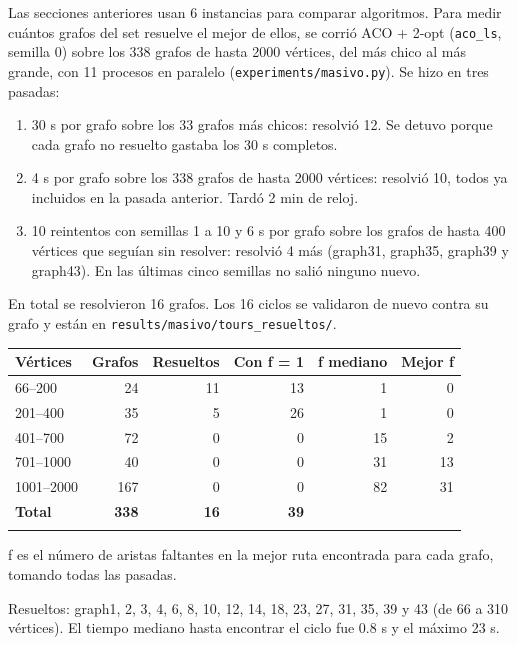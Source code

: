 \documentclass[
  spanish,
  11pt,
]{article}
\begin{document}
Las secciones anteriores usan 6 instancias para comparar algoritmos.
Para medir cuántos grafos del set resuelve el mejor de ellos, se corrió
ACO + 2-opt (\texttt{aco\_ls}, semilla 0) sobre los 338 grafos de hasta
2000 vértices, del más chico al más grande, con 11 procesos en paralelo
(\texttt{experiments/masivo.py}). Se hizo en tres pasadas:

\begin{enumerate}
\item
  30 s por grafo sobre los 33 grafos más chicos: resolvió 12. Se detuvo
  porque cada grafo no resuelto gastaba los 30 s completos.
\item
  4 s por grafo sobre los 338 grafos de hasta 2000 vértices: resolvió
  10, todos ya incluidos en la pasada anterior. Tardó 2 min de reloj.
\item
  10 reintentos con semillas 1 a 10 y 6 s por grafo sobre los grafos de
  hasta 400 vértices que seguían sin resolver: resolvió 4 más (graph31,
  graph35, graph39 y graph43). En las últimas cinco semillas no salió
  ninguno nuevo.
\end{enumerate}

En total se resolvieron 16 grafos. Los 16 ciclos se validaron de nuevo
contra su grafo y están en \texttt{results/masivo/tours\_resueltos/}.

\begin{center}
\small
\begin{tabular}{@{}lrrrrr@{}}
\toprule\noalign{}
Vértices & Grafos & Resueltos & Con f = 1 & f mediano & Mejor f \\
\midrule\noalign{}
66--200 & 24 & 11 & 13 & 1 & 0 \\
201--400 & 35 & 5 & 26 & 1 & 0 \\
401--700 & 72 & 0 & 0 & 15 & 2 \\
701--1000 & 40 & 0 & 0 & 31 & 13 \\
1001--2000 & 167 & 0 & 0 & 82 & 31 \\
\midrule\noalign{}
\textbf{Total} & \textbf{338} & \textbf{16} & \textbf{39} & & \\
\bottomrule\noalign{}
\end{tabular}
\end{center}

f es el número de aristas faltantes en la mejor ruta encontrada para
cada grafo, tomando todas las pasadas.

Resueltos: graph1, 2, 3, 4, 6, 8, 10, 12, 14, 18, 23, 27, 31, 35, 39 y
43 (de 66 a 310 vértices). El tiempo mediano hasta encontrar el ciclo
fue 0.8 s y el máximo 23 s.
\end{document}
